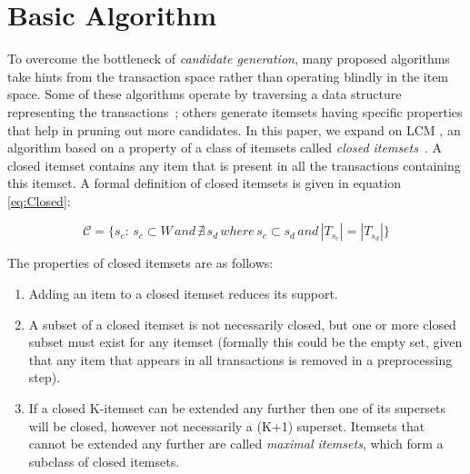 \documentclass[letterpaper,12pt,titlepage,oneside,final]{book}
\begin{document}
\section{Basic Algorithm}
\label{sec:lcm}
To overcome the bottleneck of \emph{candidate generation}, many proposed
algorithms take hints from the transaction space rather than operating blindly
in the item space.
Some of these algorithms operate by traversing a data structure representing
the transactions~\cite{han2000mining}; others generate itemsets having
specific properties that help in pruning out more candidates.
In this paper, we expand on LCM \cite{uno2004lcm}, an algorithm based on a
property of a class of itemsets called
\emph{closed itemsets}~\cite{pasquier1999discovering}.
A closed itemset contains any item that is present in all the transactions
containing this itemset.
A formal definition of closed itemsets is given in equation \ref{eq:Closed}: 

\begin{equation}\label{eq:Closed}\mathcal{C} = \{s_c:\, s_c \subset W \, and \,\nexists \, s_d \, where \, s_c  \subset s_d \, and \, |T_{s_c}| = |T_{s_d}|\}\end{equation}

The properties of closed itemsets are as follows:
\begin{enumerate}
\item Adding an item to a closed itemset reduces its support. 
\item A subset of a closed itemset is not necessarily closed, but one or more closed subset must exist for any itemset (formally this could be the empty set, given that any item that appears in all transactions is removed in a preprocessing step). 
\item If a closed K-itemset can be extended any further then one of its supersets will be closed, however not necessarily a (K+1) superset. Itemsets that cannot be extended any further are called \emph{maximal itemsets}, which form a subclass of closed itemsets.
\end{enumerate}
\end{document}
